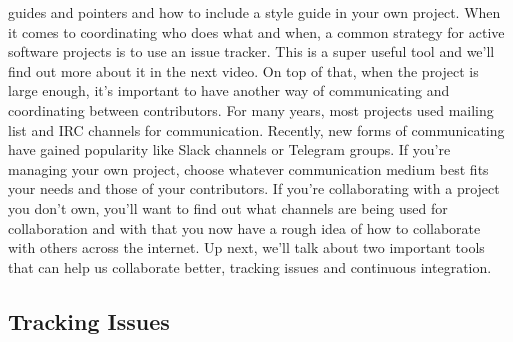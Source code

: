 guides and pointers and how to include a style guide in your own project. When it comes to coordinating who does what and when, a common strategy for active software projects is to use an issue tracker. This is a super useful tool and we'll find out more about it in the next video. On top of that, when the project is large enough, it's important to have another way of communicating and coordinating between contributors. For many years, most projects used mailing list and IRC channels for communication. Recently, new forms of communicating have gained popularity like Slack channels or Telegram groups. If you're managing your own project, choose whatever communication medium best fits your needs and those of your contributors. If you're collaborating with a project you don't own, you'll want to find out what channels are being used for collaboration and with that you now have a rough idea of how to collaborate with others across the internet. Up next, we'll talk about two important tools that can help us collaborate better, tracking issues and continuous integration.
	
	\subsection{Tracking Issues}
	
